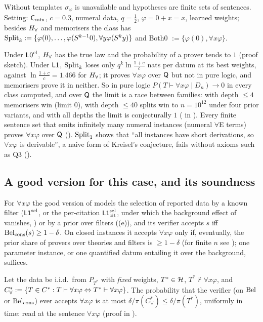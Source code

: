 Without templates $\sigma_\varphi$ is unavailable and hypotheses are finite sets of sentences. Setting: $\mathsf{C}_{\min}$, $c=0.3$, numeral data, $q=\tfrac12$, $\varphi=0+x=x$, learned weights; besides $H_{\forall}$ and memorisers the class has $\mathrm{Split}_k:=\{\varphi(0),\dots,\varphi(S^{k-1}0),\forall y\varphi(S^ky)\}$ and Both0 $:=\{\varphi(0),\forall x\varphi\}$.

Under $\mathord{\mathsf{L0}}^{\mathrm{cl}}$, $H_{\forall}$ has the true law and the probability of a prover tends to $1$ (proof sketch). Under $\mathord{\mathsf{L1}}$, $\mathrm{Split}_k$ loses only $q^k\ln\frac{1+c}c$ nats per datum at its best weights, against $\ln\frac{1+c}c=1.466$ for $H_{\forall}$; it proves $\forall x\varphi$ over $\mathsf{Q}$ but not in pure logic, and memorisers prove it in neither. So in pure logic $P(T\vdash\forall x\varphi\mid D_n)\to0$ in every class computed, and over $\mathsf{Q}$ the limit is a race between families: with depth $\le4$ memorisers win (limit $0$), with depth $\le40$ splits win to $n=10^{12}$ under four prior variants, and with all depths the limit is conjecturally $1$ ( in ). Every finite sentence set that emits infinitely many numeral instances (numeral $\forall$E terms) proves $\forall x\varphi$ over $\mathsf{Q}$ (). $\mathrm{Split}_1$ shows that ``all instances have short derivations, so $\forall x\varphi$ is derivable'', a naive form of Kreisel's conjecture, fails without axioms such as Q3 ().

\subsection{A good version for this case, and its soundness}\label{sec:univ:intuition}

For $\forall x\varphi$ the good version of  models the selection of reported data by a known filter ($\mathord{\mathsf{L1}}^{\mathrm{sel}}$, or the per-citation $\mathord{\mathsf{L1}}^{\mathrm{sel}}_{\mathrm{cit}}$, under which the background effect of  vanishes, ) or by a prior over filters ((e)), and its verifier accepts $s$ iff $\mathrm{Bel}_{\mathrm{cons}}(s)\ge1-\delta$. On closed instances it accepts $\forall x\varphi$ only if, eventually, the prior share of provers over theories and filters is $\ge1-\delta$ (for finite $n$ see ); one parameter instance, or one quantified datum entailing it over the background, suffices.

\begin{corollary}\label{cor:univ:sound}
Let the data be i.i.d.\ from $P_{T^*}$ with \emph{fixed} weights, $T^*\in\mathcal{H}$, $T^*\nvdash\forall x\varphi$, and $C^*_\forall:=\{T\in C^{*}:T\vdash\forall x\varphi\Leftrightarrow T^*\vdash\forall x\varphi\}$. The probability that the verifier (on $\mathrm{Bel}$ or $\mathrm{Bel}_{\mathrm{cons}}$) ever accepts $\forall x\varphi$ is at most $\delta/\pi(C^*_\forall)\le\delta/\pi(T^*)$, uniformly in time:  read at the sentence $\forall x\varphi$ (proof in ).
\end{corollary}

